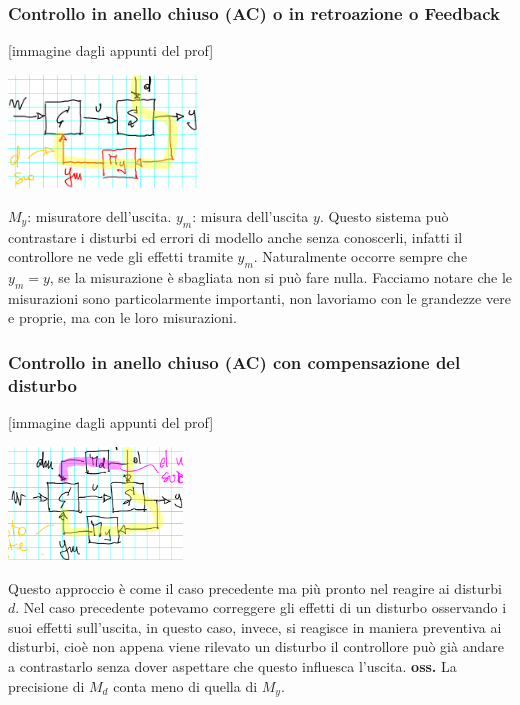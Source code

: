 \subsubsection{Controllo in anello chiuso (AC) o in retroazione o Feedback}
[immagine dagli appunti del prof]
\begin{center}
    \includegraphics[height=3cm]{../lezione1/img4.PNG}
\end{center}
$M_y$: misuratore dell'uscita.\newline
$y_m$: misura dell'uscita $y$.\newline
Questo sistema può contrastare i disturbi ed errori di modello anche senza conoscerli, infatti il controllore ne vede gli effetti tramite $y_m$.\newline
Naturalmente occorre sempre che $y_m = y$, se la misurazione è sbagliata non si può fare nulla. Facciamo notare che le misurazioni sono particolarmente importanti, non lavoriamo con le grandezze vere e proprie, ma con le loro misurazioni.
\subsubsection{Controllo in anello chiuso (AC) con compensazione del disturbo}
[immagine dagli appunti del prof]
\begin{center}
    \includegraphics[height=3cm]{../lezione1/img5.PNG}
\end{center}
Questo approccio è come il caso precedente ma più pronto nel reagire ai disturbi $d$. Nel caso precedente potevamo correggere gli effetti di un disturbo osservando i suoi effetti sull'uscita, in questo caso, invece, si reagisce in maniera preventiva ai disturbi, cioè non appena viene rilevato un disturbo il controllore può già andare a contrastarlo senza dover aspettare che questo influesca l'uscita.\newline
\textbf{oss.} La precisione di $M_d$ conta meno di quella di $M_y$.
